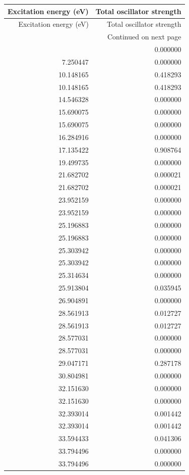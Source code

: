 \begin{longtable}{rr}
\toprule
Excitation energy (eV) & Total oscillator strength \\
\midrule
\endfirsthead
\toprule
Excitation energy (eV) & Total oscillator strength \\
\midrule
\endhead
\midrule
\multicolumn{2}{r}{Continued on next page} \\
\midrule
\endfoot
\bottomrule
\endlastfoot
7.250447 & 0.000000 \\
7.250447 & 0.000000 \\
10.148165 & 0.418293 \\
10.148165 & 0.418293 \\
14.546328 & 0.000000 \\
15.690075 & 0.000000 \\
15.690075 & 0.000000 \\
16.284916 & 0.000000 \\
17.135422 & 0.908764 \\
19.499735 & 0.000000 \\
21.682702 & 0.000021 \\
21.682702 & 0.000021 \\
23.952159 & 0.000000 \\
23.952159 & 0.000000 \\
25.196883 & 0.000000 \\
25.196883 & 0.000000 \\
25.303942 & 0.000000 \\
25.303942 & 0.000000 \\
25.314634 & 0.000000 \\
25.913804 & 0.035945 \\
26.904891 & 0.000000 \\
28.561913 & 0.012727 \\
28.561913 & 0.012727 \\
28.577031 & 0.000000 \\
28.577031 & 0.000000 \\
29.047171 & 0.287178 \\
30.804981 & 0.000000 \\
32.151630 & 0.000000 \\
32.151630 & 0.000000 \\
32.393014 & 0.001442 \\
32.393014 & 0.001442 \\
33.594433 & 0.041306 \\
33.794496 & 0.000000 \\
33.794496 & 0.000000 \\

\end{longtable}
